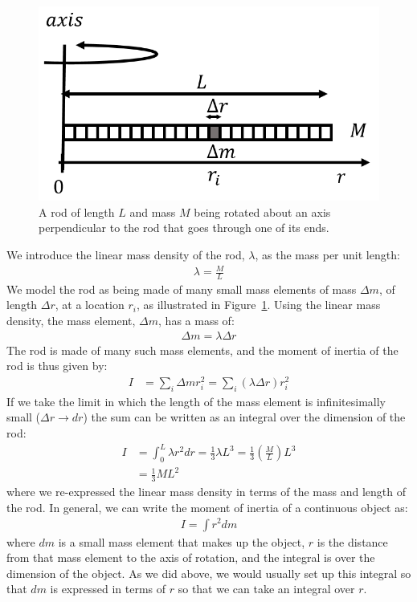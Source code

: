 \begin{figure}[!htbp]
\centering
\includegraphics[width=0.375\linewidth]{files/rod-236de0348bd69eedae0f70e34e58fcf2.png}
\caption[]{A rod of length $L$ and mass $M$ being rotated about an axis perpendicular to the rod that goes through one of its ends.}
\label{fig:rotationaldynamics:rod}
\end{figure}

We introduce the linear mass density of the rod, $\lambda$, as the mass per unit length:
\begin{align*}
\lambda = \frac{M}{L}
\end{align*}
We model the rod as being made of many small mass elements of mass $\Delta m$, of length $\Delta r$, at a location $r_i$, as illustrated in Figure~\ref{fig:rotationaldynamics:rod}. Using the linear mass density, the mass element, $\Delta m$, has a mass of:
\begin{align*}
\Delta m = \lambda \Delta r
\end{align*}
The rod is made of many such mass elements, and the moment of inertia of the rod is thus given by:
\begin{align*}
I &= \sum_i \Delta m r_i^2 =\sum_i \left(\lambda \Delta r\right) r_i^2
\end{align*}
If we take the limit in which the length of the mass element is infinitesimally small ($\Delta r \to dr$) the sum can be written as an integral over the dimension of the rod:
\begin{align*}
I &= \int_0^L\lambda r^2dr = \frac{1}{3}\lambda L^3 = \frac{1}{3}\left( \frac{M}{L} \right)L^3 \\
&=\frac{1}{3} ML^2
\end{align*}
where we re-expressed the linear mass density in terms of the mass and length of the rod. In general, we can write the moment of inertia of a continuous object as:
\begin{align*}
I = \int r^2 dm 
\end{align*}
where $dm$ is a small mass element that makes up the object, $r$ is the distance from that mass element to the axis of rotation, and the integral is over the dimension of the object. As we did above, we would usually set up this integral so that $dm$ is expressed in terms of $r$ so that we can take an integral over $r$.

